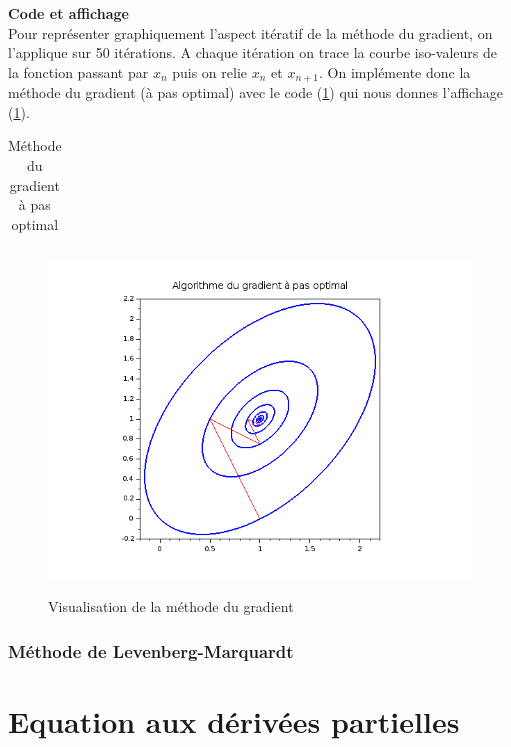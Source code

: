 \documentclass[a4paper,10pt]{report}
\begin{document}
\textbf{Code et affichage}\\
Pour représenter graphiquement l'aspect itératif de la méthode du gradient, on l'applique sur 50 itérations. A chaque itération on trace la courbe iso-valeurs de la fonction passant par $x_n$ puis on relie $x_n$ et $x_{n+1}$. On implémente donc la méthode du gradient (à pas optimal) avec le code (\ref{gradient}) qui nous donnes l'affichage (\ref{graph_gradient}).\\

\begin{table}[H]
\caption{Méthode du gradient à pas optimal}
\begin{tabular}{l}

\label{gradient}
\end{tabular}
\end{table}

\begin{figure}[H]
\centering
\caption{Visualisation de la méthode du gradient}
\includegraphics[width=\textwidth]{gradient.png}
\label{graph_gradient}
\end{figure}


\subsection{Méthode de Levenberg-Marquardt}

\chapter{Equation aux dérivées partielles}
\end{document}
